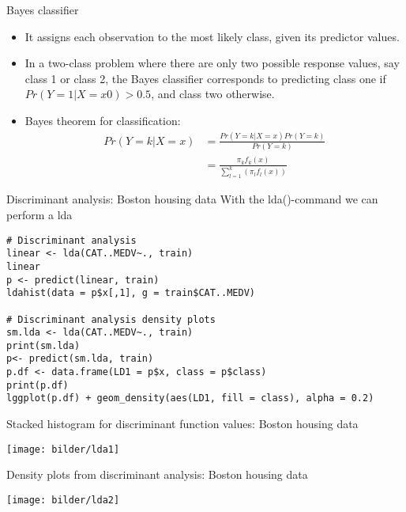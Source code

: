 \documentclass{beamer}
\begin{document}
\begin{frame}{Bayes classifier}
	\begin{itemize}
		\item
	It	assigns each observation to the most likely class,
given its predictor values.
		\vspace{0.2cm}	
		\item
		In a two-class problem where there are only two possible response values, say class 1 or class 2, the Bayes classifier corresponds to predicting class one if $Pr(Y = 1|X = x0) > 0.5$, and class
two otherwise.	
	\vspace{0.2cm}	
\item
Bayes theorem for classification:
	\begin{align*}\nonumber
	Pr(Y=k|X=x)&=\frac{Pr(Y=k|X=x)Pr(Y=k)}{Pr(Y=k)}\\
	&=\frac{\pi_kf_k(x)}{\sum_{l=1}^{k}(\pi_lf_l(x))}
\end{align*}	
	\end{itemize}
\end{frame}


\begin{frame}[fragile]{Discriminant analysis: Boston housing data}
With the {lda()}-command we can perform a lda
	\begin{lstlisting}
# Discriminant analysis 
linear <- lda(CAT..MEDV~., train)
linear
p <- predict(linear, train)
ldahist(data = p$x[,1], g = train$CAT..MEDV)

# Discriminant analysis density plots
sm.lda <- lda(CAT..MEDV~., train)
print(sm.lda)
p<- predict(sm.lda, train)
p.df <- data.frame(LD1 = p$x, class = p$class) 
print(p.df)
lggplot(p.df) + geom_density(aes(LD1, fill = class), alpha = 0.2)		
	\end{lstlisting}
		
\end{frame}


\begin{frame}[fragile]{Stacked histogram for discriminant function values: Boston housing data}
	\begin{center}
		\texttt{[image: bilder/lda1]}
	\end{center}	
\end{frame}

\begin{frame}[fragile]{Density plots from discriminant analysis: Boston housing data}
	\begin{center}
		\texttt{[image: bilder/lda2]}
	\end{center}	
\end{frame}
\end{document}
